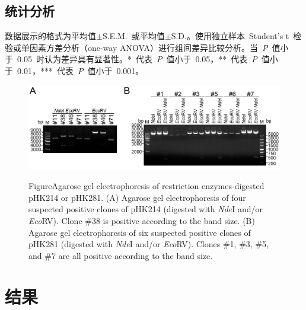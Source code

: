 \subsection{统计分析}\label{subsec:statistics}
数据展示的格式为平均值$\pm$S.E.M.\ 或平均值$\pm$S.D.。使用独立样本\ Student's t\ 检验或单因素方差分析（one-way ANOVA）进行组间差异比较分析。当\ \textit{P}\ 值小于\ 0.05\ 时认为差异具有显著性。*\ 代表\ \textit{P}\ 值小于\ 0.05，**\ 代表\ \textit{P}\ 值小于\ 0.01，***\ 代表\ \textit{P}\ 值小于\ 0.001。
\renewcommand{\figurename}{图}
\begin{figure}[ht]
\centering
\graphicspath{{figures/}}
\includegraphics[width=\textwidth]{fig3-1.jpg}
{
 {Figure}{Agarose gel electrophoresis of restriction enzymes-digested pHK214 or pHK281. (A) Agarose gel electrophoresis of four suspected positive clones of pHK214 (digested with \textit{Nde}I and/or \textit{Eco}RV). Clone \#38 is positive according to the band size. (B) Agarose gel electrophoresis of six suspected positive clones of pHK281 (digested with \textit{Nde}I and/or \textit{Eco}RV). Clones \#1, \#3, \#5, and \#7 are all positive according to the band size.}
\par}
\end{figure}
\section{结果}
